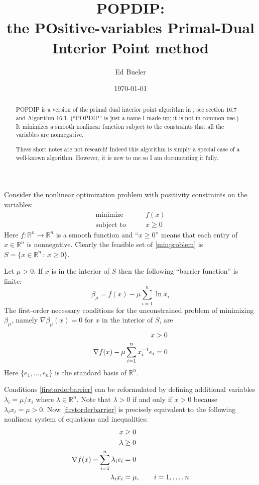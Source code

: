 \documentclass[11pt]{article}
\title{POPDIP: \\ the POsitive-variables Primal-Dual Interior Point method}
\author{Ed Bueler}
\date{\today}
\newcommand{\RR}{\mathbb{R}}
\newcommand{\grad}{\nabla}
\begin{document}
\maketitle

\begin{abstract}
POPDIP is a version of the primal dual interior point algorithm in \cite{GrivaNashSofer2009}; see section 16.7 and Algorithm 16.1.  (``POPDIP'' is just a name I made up; it is not in common use.)  It minimizes a smooth nonlinear function subject to the constraints that all the variables are nonnegative.

These short notes are not research!  Indeed this algorithm is simply a special case of a well-known algorithm.  However, it is new to me so I am documenting it fully.
\end{abstract}

\thispagestyle{empty}

\bigskip
Consider the nonlinear optimization problem with positivity constraints on the variables:
\begin{equation}
\begin{matrix}
\text{minimize} \qquad & f(x) \\
\text{subject to} \qquad & x \ge 0
\end{matrix} \label{minproblem}
\end{equation}
Here $f:\RR^n\to\RR^n$ is a smooth function and ``$x\ge 0$'' means that each entry of $x\in\RR^n$ is nonnegative.  Clearly the feasible set of \eqref{minproblem} is $S = \{x\in \RR^n\,:\,x\ge 0\}$.

Let $\mu>0$.  If $x$ is in the interior of $S$ then the following ``barrier function'' is finite:
\begin{equation}
\beta_\mu = f(x) - \mu \sum_{i=1}^n \ln x_i \label{barrierfunction}
\end{equation}
The first-order necessary conditions for the unconstrained problem of minimizing $\beta_\mu$, namely $\grad \beta_\mu(x)=0$ for $x$ in the interior of $S$, are
\begin{align}
x &> 0 \label{firstorderbarrier} \\
\grad f(x) - \mu \sum_{i=1}^n x_i^{-1} e_i &= 0 \notag
\end{align}
Here $\{e_1,\dots,e_n\}$ is the standard basis of $\RR^n$.

Conditions \eqref{firstorderbarrier} can be reformulated by defining additional variables $\lambda_i = \mu / x_i$ where $\lambda\in\RR^n$.  Note that $\lambda>0$ if and only if $x>0$ because $\lambda_i x_i = \mu > 0$.  Now \eqref{firstorderbarrier} is precisely equivalent to the following nonlinear system of equations and inequalities:
\begin{align}
x &\ge 0 \label{firstordersystem} \\
\lambda &\ge 0 \notag \\
\grad f(x) - \sum_{i=1}^n \lambda_i e_i &= 0 \notag \\
\lambda_i x_i &= \mu, \qquad i=1,\dots,n \notag
\end{align}
\end{document}
